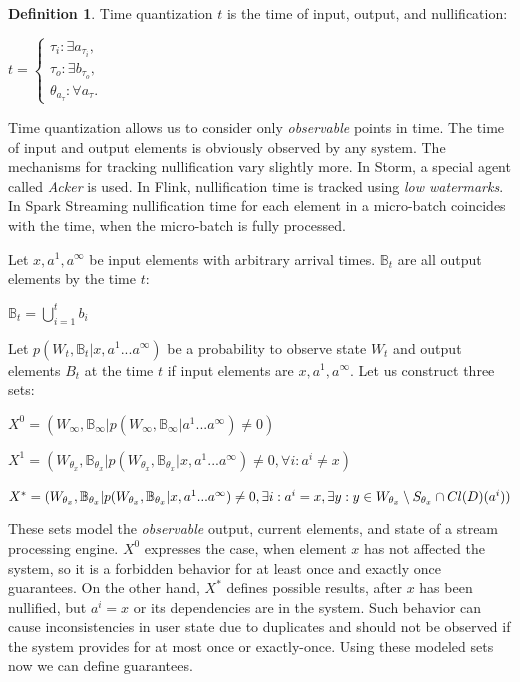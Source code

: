\documentclass[sigconf]{acmart}
\theoremstyle{definition}
\newtheorem{definition}{Definition}
\begin{document}
\begin{definition}{Time quantization}
$t$ is the time of input, output, and nullification:

$t=\begin{cases}
\tau_i:\exists{a_{\tau_i}}, \\
\tau_o:\exists{b_{\tau_o}}, \\
\theta_{a_\tau}:\forall{a_\tau}.
\end{cases}$
\end{definition}

Time quantization allows us to consider only {\em observable} points in time. The time of input and output elements is obviously observed by any system. The mechanisms for tracking nullification vary slightly more. In Storm, a special agent called {\em Acker} is used. In Flink, nullification time is tracked using {\em low watermarks}. In Spark Streaming nullification time for each element in a micro-batch coincides with the time, when the micro-batch is fully processed.

Let $x,a^{1},a^\infty$ be input elements with arbitrary arrival times. $\mathbb{B}_t$ are all output elements by the time $t$:

$\mathbb{B}_t=\bigcup\limits_{i=1}^{t}{b_i}$

Let $p(W_t,\mathbb{B}_t|x,a^{1}...a^\infty)$ be a probability to observe state $W_t$ and output elements $B_t$ at the time $t$ if input elements are $x,a^{1},a^\infty$. Let us construct three sets:

$X^0=(W_\infty,\mathbb{B}_\infty|p(W_\infty,\mathbb{B}_\infty|a^{1}...a^\infty)\neq{0})$

$X^1=(W_{\theta_{x}},\mathbb{B}_{\theta_{x}}|p(W_{\theta_{x}},\mathbb{B}_{\theta_{x}}|x,a^{1}...a^\infty)\neq{0},\forall{i}:{a^i}\neq{x})$

$X^{*}=(W_{\theta_{x}},\mathbb{B}_{\theta_{x}}|p(W_{\theta_{x}},\mathbb{B}_{\theta_{x}}|x,a^{1}...a^\infty)\neq{0},\\
\exists{i}:{a^i={x}},\exists{y:y\in{W_{\theta_{x}}\setminus{S_{\theta_x}}}\cap{Cl(D)(a^i)}})$

These sets model the {\em observable} output, current elements, and state of a stream processing engine. $X^0$ expresses the case, when element $x$ has not affected the system, so it is a forbidden behavior for at least once and exactly once guarantees. On the other hand, $X^{*}$ defines possible results, after $x$ has been nullified, but $a^i=x$ or its dependencies are in the system. Such behavior can cause inconsistencies in user state due to duplicates and should not be observed if the system provides for at most once or exactly-once. Using these modeled sets now we can define guarantees.
\end{document}
